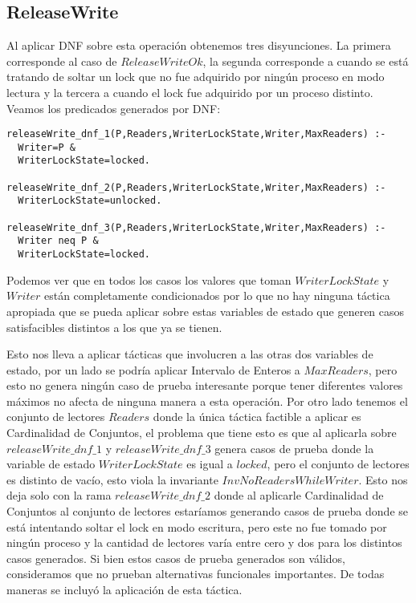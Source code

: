 \documentclass[a4paper, 12pt]{article}
\begin{document}
\subsection{ReleaseWrite}
Al aplicar DNF sobre esta operación obtenemos tres disyunciones. La primera corresponde al caso de $ReleaseWriteOk$, la segunda corresponde a cuando se está tratando de soltar un lock que no fue adquirido por ningún proceso en modo lectura y la tercera a cuando el lock fue adquirido por un proceso distinto.\\
Veamos los predicados generados por DNF:
\begin{verbatim}
releaseWrite_dnf_1(P,Readers,WriterLockState,Writer,MaxReaders) :-
  Writer=P &
  WriterLockState=locked.

releaseWrite_dnf_2(P,Readers,WriterLockState,Writer,MaxReaders) :-
  WriterLockState=unlocked.

releaseWrite_dnf_3(P,Readers,WriterLockState,Writer,MaxReaders) :-
  Writer neq P &
  WriterLockState=locked.
\end{verbatim}

Podemos ver que en todos los casos los valores que toman $WriterLockState$ y $Writer$ están completamente condicionados por lo que no hay ninguna táctica apropiada que se pueda aplicar sobre estas variables de estado que generen casos satisfacibles distintos a los que ya se tienen.

Esto nos lleva a aplicar tácticas que involucren a las otras dos variables de estado, por un lado se podría aplicar Intervalo de Enteros a $MaxReaders$, pero esto no genera ningún caso de prueba interesante porque tener diferentes valores máximos no afecta de ninguna manera a esta operación. Por otro lado tenemos el conjunto de lectores $Readers$ donde la única táctica factible a aplicar es Cardinalidad de Conjuntos, el problema que tiene esto es que al aplicarla sobre $releaseWrite\_dnf\_1$ y $releaseWrite\_dnf\_3$ genera casos de prueba donde la variable de estado $WriterLockState$ es igual a $locked$, pero el conjunto de lectores es distinto de vacío, esto viola la invariante $InvNoReadersWhileWriter$. Esto nos deja solo con la rama $releaseWrite\_dnf\_2$ donde al aplicarle Cardinalidad de Conjuntos al conjunto de lectores estaríamos generando casos de prueba donde se está intentando soltar el lock en modo escritura, pero este no fue tomado por ningún proceso y la cantidad de lectores varía entre cero y dos para los distintos casos generados. Si bien estos casos de prueba generados son válidos, consideramos que no prueban alternativas funcionales importantes. De todas maneras se incluyó la aplicación de esta táctica.
\end{document}
